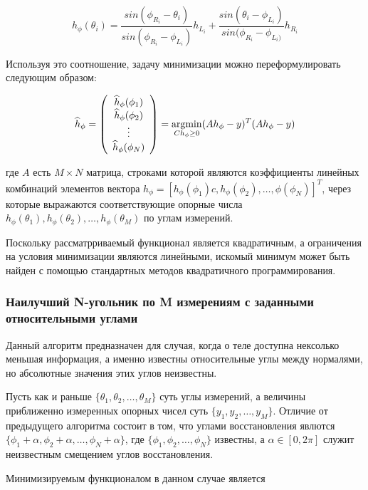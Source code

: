\documentclass[a4paper,12pt, titlepage]{article}
\begin{document}
$$
h_{\phi}(\theta_{i}) =
\frac{sin(\phi_{R_{i}} - \theta_{i})}{sin(\phi_{R_{i}} - \phi_{L_{i}})}
h_{L_{i}} +
\frac{sin(\theta_{i} - \phi_{L_{i}})}{sin(\phi_{R_{i}} - \phi_{L_{i})}}
h_{R_{i}}
$$

Используя это соотношение, задачу минимизации можно переформулировать следующим
образом:

$$
\widehat{h}_{\phi} = \left(
\begin{array}{c}
 \widehat{h}_{\phi}(\phi_{1}) \\
 \widehat{h}_{\phi}(\phi_{2}) \\
 \vdots \\
 \widehat{h}_{\phi}(\phi_{N}) \\
\end{array}
\right) = \operatornamewithlimits{argmin}_{C h_{\phi} \geq 0} (A h_{\phi} -
y)^{T} (A h_{\phi} - y)
$$

где $A$ есть $M \times N$ матрица, строками которой являются коэффициенты
линейных комбинаций элементов вектора $h_{\phi} = [h_{\phi}(\phi_{1})c,
h_{\phi}(\phi_{2}), \ldots, {\phi}(\phi_{N})]^{T}$, через которые
выражаются соответствующие опорные числа $h_{\phi}(\theta_{1}),
h_{\phi}(\theta_{2}), \ldots, h_{\phi}(\theta_{M})$ по углам измерений.

Поскольку рассматрриваемый функционал является квадратичным, а ограничения на
условия минимизации являются линейными, искомый минимум может быть найден с
помощью стандартных методов квадратичного программирования.

\subsubsection{Наилучший N-угольник по M измерениям с заданными относительными 
углами}

Данный алгоритм предназначен для случая, когда о теле доступна нексолько
меньшая информация, а именно известны относительные углы между нормалями, но
абсолютные значения этих углов неизвестны.

Пусть как и раньше $\{\theta_{1}, \theta_{2}, \ldots,
\theta_{M}\}$ суть углы измерений, а величины приближенно измеренных опорных
чисел суть $\{y_{1}, y_{2}, \ldots, y_{M}\}$. Отличие от предыдущего алгоритма 
состоит в том, что углами восстановления явлются $\{\phi_{1} + \alpha,
\phi_{2} + \alpha, \ldots, \phi_{N} + \alpha\}$, где $\{\phi_{1}, \phi_{2},
\ldots, \phi_{N}\}$ известны, а $\alpha \in [0, 2 \pi]$ служит неизвестным
смещением углов восстановления.

Минимизируемым функционалом в данном случае является
\end{document}
